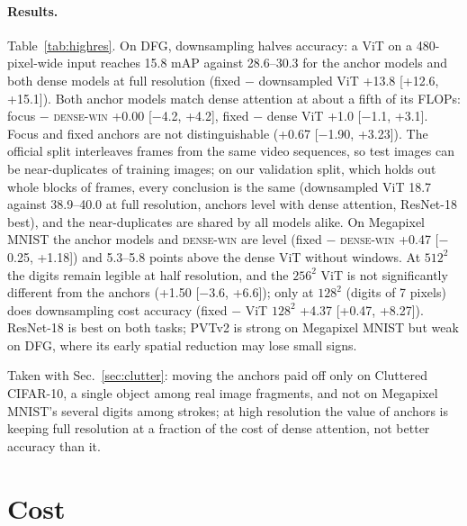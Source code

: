\documentclass[runningheads]{llncs}
\newcommand{\densewin}{\textsc{dense-win}}
\begin{document}
\paragraph{Results.} Table~\ref{tab:highres}. On DFG, downsampling halves accuracy: a ViT on a
480-pixel-wide input reaches 15.8 mAP against 28.6--30.3 for the anchor models and both dense
models at full resolution (fixed $-$ downsampled ViT +13.8 [+12.6, +15.1]). Both anchor models match dense attention at
about a fifth of its FLOPs: focus $-$ \densewin{} +0.00 [$-$4.2, +4.2], fixed $-$ dense ViT +1.0
[$-$1.1, +3.1]. Focus and fixed anchors are not distinguishable (+0.67 [$-$1.90, +3.23]). The
official split interleaves frames from the same video sequences, so test images can be
near-duplicates of training images; on our validation split, which holds out whole blocks of
frames, every conclusion is the same (downsampled ViT 18.7 against 38.9--40.0 at full resolution,
anchors level with dense attention, ResNet-18 best), and the near-duplicates are shared by all
models alike. On
Megapixel MNIST the anchor models and \densewin{} are level (fixed $-$ \densewin{} +0.47
[$-$0.25, +1.18]) and 5.3--5.8 points above the dense ViT without windows. At $512^2$ the digits
remain legible at half resolution, and the $256^2$ ViT is not significantly different from the
anchors (+1.50 [$-$3.6, +6.6]); only at $128^2$ (digits of 7 pixels) does downsampling cost
accuracy (fixed $-$ ViT $128^2$ +4.37 [+0.47, +8.27]). ResNet-18 is best on both tasks; PVTv2 is
strong on Megapixel MNIST but weak on DFG, where its early spatial reduction may lose small signs.

Taken with Sec.~\ref{sec:clutter}: moving the anchors paid off only on Cluttered CIFAR-10, a
single object among real image fragments, and not on Megapixel MNIST's several digits among
strokes; at high resolution the value of anchors is keeping full resolution at a fraction of the
cost of dense attention, not better accuracy than it.

\section{Cost}
\label{sec:cost}
\end{document}
